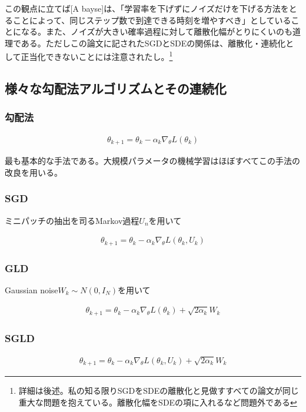 \documentclass{jsarticle}
\begin{document}
この観点に立てば[A bayse]は、「学習率を下げずにノイズだけを下げる方法をとることによって、同じステップ数で到達できる時刻を増やすべき」としていることになる。また、ノイズが大きい確率過程に対して離散化幅がとりにくいのも道理である。ただしこの論文に記されたSGDとSDEの関係は、離散化・連続化として正当化できないことには注意されたし。\footnote{詳細は後述。私の知る限りSGDをSDEの離散化と見做すすべての論文が同じ重大な問題を抱えている。離散化幅をSDEの項に入れるなど問題外である}





\subsection{様々な勾配法アルゴリズムとその連続化}
\subsubsection{勾配法}
\begin{align}
\theta_{k+1}=\theta_k-\alpha_k\nabla_\theta L(\theta_k)
\end{align}

最も基本的な手法である。大規模パラメータの機械学習はほぼすべてこの手法の改良を用いる。

\subsubsection{SGD}

ミニパッチの抽出を司るMarkov過程$U_n$を用いて

\begin{align}
\theta_{k+1}=\theta_k-\alpha_k\nabla_\theta L(\theta_k,U_k)
\end{align}

\subsubsection{GLD}

Gaussian noise$W_k\sim N(0,I_N)$を用いて

\begin{align}
\theta_{k+1}=\theta_k-\alpha_k\nabla_\theta L(\theta_k)+\sqrt{2\alpha_k}W_k
\end{align}

\subsubsection{SGLD}

\begin{align}
\theta_{k+1}=\theta_k-\alpha_k\nabla_\theta L(\theta_k,U_k)+\sqrt{2\alpha_k}W_k
\end{align}
\end{document}
